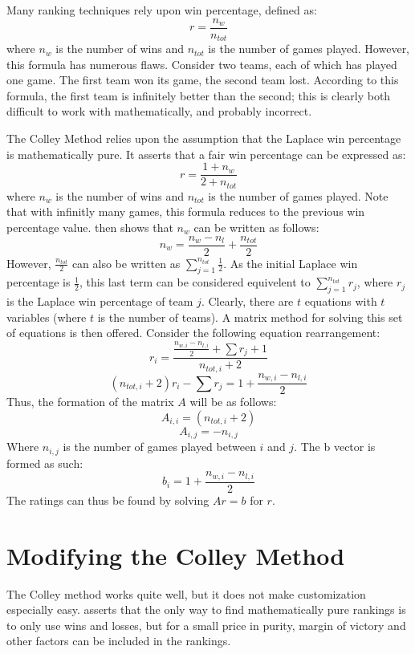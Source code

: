 \documentclass[12pt, letterpaper]{article}
\begin{document}
\par Many ranking techniques rely upon win percentage, defined as:
$$ r = \frac{n_w}{n_{tot}}$$
where $n_w$ is the number of wins and $n_{tot}$ is the number of games played.  However, this formula has numerous flaws.  Consider two teams, each of which has played one game.  The first team won its game, the second team lost.  According to this formula, the first team is infinitely better than the second; this is clearly both difficult to work with mathematically, and probably incorrect.

\par The Colley Method relies upon the assumption that the Laplace win percentage is mathematically pure.  It asserts that a fair win percentage can be expressed as:
$$ r = \frac{1+n_w}{2+n_{tot}} $$
where $n_w$ is the number of wins and $n_{tot}$ is the number of games played.  Note that with infinitly many games, this formula reduces to the previous win percentage value.  \cite{colley02} then shows that $n_w$ can be written as follows:
$$ n_w = \frac{n_w-n_l}{2} + \frac{n_{tot}}{2}$$
However, $\displaystyle \frac{n_{tot}}{2}$ can also be written as $\displaystyle \sum_{j=1}^{n_{tot}}{\frac{1}{2}}$.  As the initial Laplace win percentage is $\displaystyle \frac{1}{2}$, this last term can be considered equivelent to $\displaystyle \sum_{j=1}^{n_{tot}}{r_j}$, where $r_j$ is the Laplace win percentage of team $j$.  Clearly, there are $t$ equations with $t$ variables (where $t$ is the number of teams).  A matrix method for solving this set of equations is then offered.  Consider the following equation rearrangement:
$$ r_i = \frac{\frac{n_{w,i}-n_{l,i}}{2}+\sum{r_j}+1}{n_{tot,i}+2}$$
$$ (n_{tot,i}+2)r_i-\sum{r_j} = 1+\frac{n_{w,i}-n_{l,i}}{2} $$
Thus, the formation of the matrix $A$ will be as follows:
$$ A_{i,i} = (n_{tot,i}+2) $$
$$ A_{i,j} = -n_{i,j} $$
Where $n_{i,j}$ is the number of games played between $i$ and $j$.  The b vector is formed as such:
$$ b_i = 1+\frac{n_{w,i}-n_{l,i}}{2} $$
The ratings can thus be found by solving $Ar=b$ for $r$.

\section {Modifying the Colley Method}

\par The Colley method works quite well, but it does not make customization especially easy.  \cite{colley02} asserts that the only way to find mathematically pure rankings is to only use wins and losses, but for a small price in purity, margin of victory and other factors can be included in the rankings.
\end{document}
